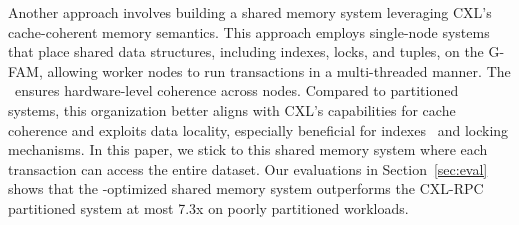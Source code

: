 
Another approach involves building a shared memory system leveraging CXL’s cache-coherent memory semantics. This approach employs single-node systems~\cite{silo_sosp13, abyss_vldb14, polyjuice_osdi21} that place shared data structures, including indexes, locks, and tuples, on the G-FAM, allowing worker nodes to run transactions in a multi-threaded manner. The \cxlbi~ensures hardware-level coherence across nodes. Compared to partitioned systems, this organization better aligns with CXL’s capabilities for cache coherence and exploits data locality, especially beneficial for indexes~\cite{masstree, learned_cache} and locking mechanisms. In this paper, we stick to this shared memory system where each transaction can access the entire dataset. Our evaluations in Section~\ref{sec:eval} shows that the \name-optimized shared memory system outperforms the CXL-RPC partitioned system at most 7.3x on poorly partitioned workloads. 






